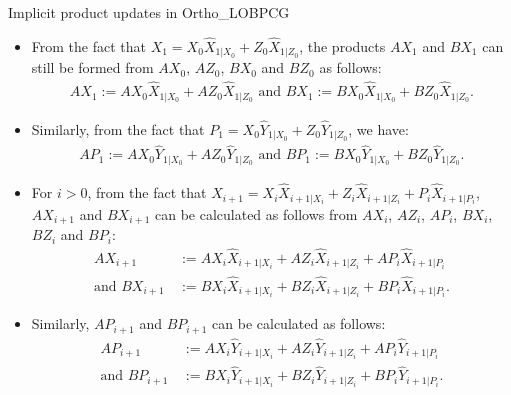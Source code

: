 \documentclass[t,usepdftitle=false]{beamer}
\begin{document}
\begin{frame}{Implicit product updates in Ortho\_LOBPCG}
	\begin{itemize}
		\item From the fact that $X_1=X_0\hat{X}_{1|X_0}+Z_0\hat{X}_{1|Z_0}$, the products $AX_1$ and $BX_1$ can still be formed from $AX_0$, $AZ_0$, $BX_0$ and $BZ_0$ as follows:
		\begin{align*}
			AX_1:=AX_0\hat{X}_{1|X_0}+AZ_0\hat{X}_{1|Z_0}
			\text{ and }
			BX_1:=BX_0\hat{X}_{1|X_0}+BZ_0\hat{X}_{1|Z_0}.
		\end{align*}
		\item Similarly, from the fact that $P_1=X_0\hat{Y}_{1|X_0}+Z_0\hat{Y}_{1|Z_0}$, we have:
		\begin{align*}
		AP_1:=AX_0\hat{Y}_{1|X_0}+AZ_0\hat{Y}_{1|Z_0}
		\text{ and }
		BP_1:=BX_0\hat{Y}_{1|X_0}+BZ_0\hat{Y}_{1|Z_0}.
		\end{align*}	
		\item For $i>0$, from the fact that $X_{i+1}=X_{i}\hat{X}_{i+1|X_i}+Z_{i}\hat{X}_{i+1|Z_i}+P_{i}\hat{X}_{i+1|P_i}$, $AX_{i+1}$ and $BX_{i+1}$ can be calculated as follows from $AX_{i}$, $AZ_i$, $AP_i$, $BX_i$, $BZ_i$ and $BP_i$:
		\begin{align*}
			AX_{i+1}&\,:=AX_{i}\hat{X}_{i+1|X_i}+AZ_{i}\hat{X}_{i+1|Z_i}+AP_{i}\hat{X}_{i+1|P_i}\\
			\text{and }
			BX_{i+1}&\,:=BX_{i}\hat{X}_{i+1|X_i}+BZ_{i}\hat{X}_{i+1|Z_i}+BP_{i}\hat{X}_{i+1|P_i}.
		\end{align*}
		\item Similarly, $AP_{i+1}$ and $BP_{i+1}$ can be calculated as follows:
		\begin{align*}
		AP_{i+1}&\,:=AX_{i}\hat{Y}_{i+1|X_i}+AZ_{i}\hat{Y}_{i+1|Z_i}+AP_{i}\hat{Y}_{i+1|P_i}\\
		\text{and }
		BP_{i+1}&\,:=BX_{i}\hat{Y}_{i+1|X_i}+BZ_{i}\hat{Y}_{i+1|Z_i}+BP_{i}\hat{Y}_{i+1|P_i}.
	\end{align*}	
	\end{itemize}
\end{frame}
\end{document}
